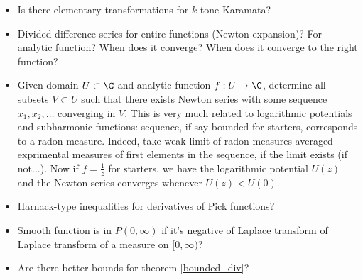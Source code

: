 \begin{itemize}
	\item Is there elementary transformations for $k$-tone Karamata?
	\item Divided-difference series for entire functions (Newton expansion)? For analytic function? When does it converge? When does it converge to the right function?
	\item Given domain $U \subset \C$ and analytic function $f : U \to \C$, determine all subsets $V \subset U$ such that there exists Newton series with some sequence $x_{1}, x_{2}, \ldots$ converging in $V$. This is very much related to logarithmic potentials and subharmonic functions: sequence, if say bounded for starters, corresponds to a radon measure. Indeed, take weak limit of radon measures averaged exprimental measures of first elements in the sequence, if the limit exists (if not...). Now if $f = \frac{1}{z}$ for starters, we have the logarithmic potential $U(z)$ and the Newton series converges whenever $U(z) < U(0)$.
	\item Harnack-type inequalities for derivatives of Pick functions?
	\item Smooth function is in $P(0, \infty)$ if it's negative of Laplace transform of Laplace transform of a measure on $[0, \infty)$?
	\item Are there better bounds for theorem \ref{bounded_div}?
\end{itemize}
